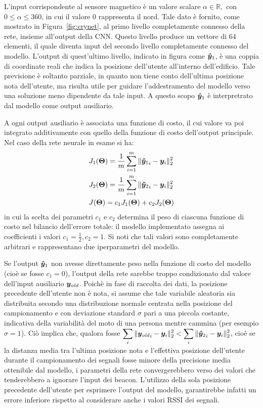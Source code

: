 L'input corrispondente al sensore magnetico è un valore scalare \(\alpha \in
  \mathbb{R}, \) con \(0 \leq \alpha \leq 360\), in cui il valore \(0\)
rappresenta il nord. Tale dato è fornito, come mostrato in
Figura~\ref{fig:crynet}, al primo livello completamente connesso della rete,
insieme all'output della CNN\@.  Questo livello produce un vettore di 64
elementi, il quale diventa input del secondo livello completamente connesso del
modello. L'output di quest'ultimo livello, indicato in figura come
\(\bm\hat{\bm y}_1\), è una coppia di coordinate reali che indica la posizione
dell'utente all'interno dell'edificio.  Tale previsione è soltanto parziale, in
quanto non tiene conto dell'ultima posizione nota dell'utente, ma risulta utile
per guidare l'addestramento del modello verso una soluzione meno dipendente da
tale input.  A questo scopo \(\bm\hat{\bm y}_1\) è interpretrato dal modello come
output ausiliario.

A ogni output ausiliario è associata una funzione di costo, il cui valore va
poi integrato additivamente con quello della funzione di costo dell'output
principale. Nel caso della rete neurale in esame si ha:
\begin{align*}
  &J_1(\bm \Theta) =  \frac{1}{m} \sum_{i=1}^m{\| {{}\bm\hat{\bm y}_1}_{i} - \bm y_i\|^2_2} \\
  &J_2(\bm \Theta) =  \frac{1}{m} \sum_{i=1}^m{\| {{}\bm\hat{\bm y}_2}_{i} - \bm y_i\|^2_2} \\
  &J(\bm \Theta) = c_1 J_1(\bm \Theta) + c_2 J_2(\bm \Theta)
\end{align*}
in cui la scelta dei parametri \(c_1\) e \(c_2\) determina il peso di ciascuna
funzione di costo nel bilancio dell'errore totale: il modello implementato
assegna ai coefficienti i valori \( c_1 = \frac{1}{2}, c_2 = 1 \). Si noti che
tali valori sono completamente arbitrari e rappresentano due iperparametri del
modello.

Se l'output \(\bm\hat{\bm y}_1\) non avesse direttamente peso nella funzione di costo
del modello (cioè se fosse \(c_1 = 0\)), l'output della rete sarebbe troppo
condizionato dal valore dell'input ausiliario \(\bm y_{\mathit{old}}\). Poichè in fase di
raccolta dei dati, la posizione precedente dell'utente non è nota, si assume
che tale variabile aleatoria sia distribuita secondo una distribuzione normale
centrata nella posizione del campionamento e con deviazione standard \(\sigma\)
pari a una piccola costante, indicativa della variabilità del moto di una
persona mentre cammina (per esempio \( \sigma = 1 \)). Ciò implica che, qualora
fosse \(\displaystyle \sum_i\| {\bm y_{\mathit{old}}}_i - \bm y_i \|^2_2 < \sum_i \|
  {{}\bm\hat{\bm y}_2}_{i} - \bm y_i\|^2_2 \), cioè se la distanza media tra l'ultima
posizione nota e l'effettiva posizione dell'utente durante il campionamento dei
segnali fosse minore della precisione media ottenibile dal modello, i
parametri della rete convergerebbero verso dei valori che tenderebbero a
ignorare l'input dei beacon. L'utilizzo della sola posizione precedente
dell'utente per esprimere l'output del modello, garantirebbe infatti un errore
inferiore rispetto al considerare anche i valori RSSI dei segnali.

